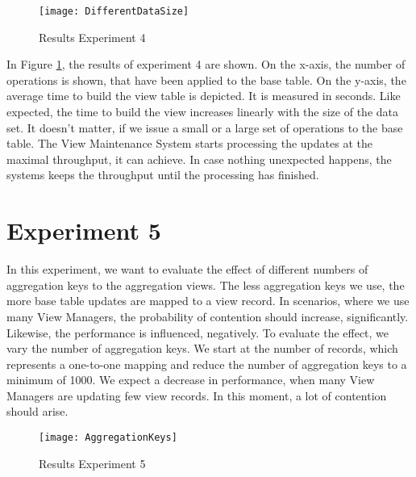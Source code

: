 \documentclass[11pt,a4paper,bibtotoc,idxtotoc,headsepline,footsepline,footexclude,BCOR12mm,DIV13]{scrbook}
\begin{document}
\begin{figure}[h!]
  
  \centering
    \texttt{[image: DifferentDataSize]}
    \caption{Results Experiment 4}
    \label{fig:differentdatasize}
\end{figure}

In Figure \ref{fig:differentdatasize}, the results of experiment 4 are shown. On the x-axis, the number of operations is shown, that have been applied to the base table. On the y-axis, the average time to build the view table is depicted. It is measured in seconds. Like expected, the time to build the view increases linearly with the size of the data set. It doesn't matter, if we issue a small or a large set of operations to the base table. The View Maintenance System starts processing the updates at the maximal throughput, it can achieve. In case nothing unexpected happens, the systems keeps the throughput until the processing has finished.


\section{Experiment 5}
\label{sec:experiment5}

In this experiment, we want to evaluate the effect of different numbers of aggregation keys to the aggregation views. The less aggregation keys we use, the more base table updates are mapped to a view record. In scenarios, where we use many View Managers, the probability of contention should increase, significantly. Likewise, the performance is influenced, negatively. To evaluate the effect, we vary the number of aggregation keys. We start at the number of records, which represents a one-to-one mapping and reduce the number of aggregation keys to a minimum of 1000. We expect a decrease in performance, when many View Managers are updating few view records. In this moment, a lot of contention should arise.


\begin{figure}[h!]
  
  \centering
    \texttt{[image: AggregationKeys]}
    \caption{Results Experiment 5}
    \label{fig:aggregationkeys}
\end{figure}
\end{document}
